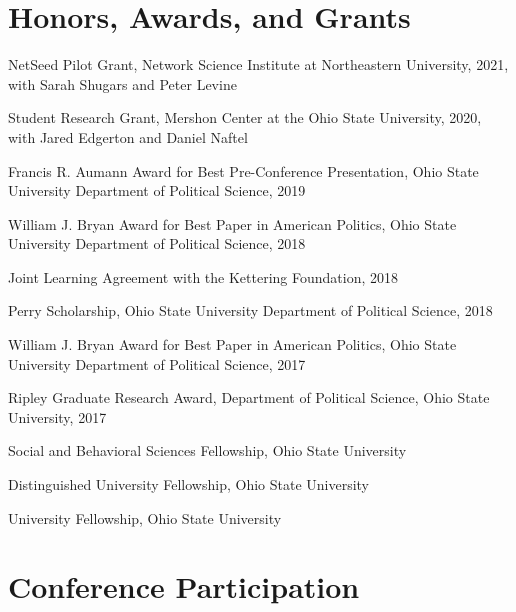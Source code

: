 \documentclass[letterpaper]{article}
\renewenvironment{itemize}{
  \begin{list}{}{
    \setlength{\leftmargin}{1.5em}
  }
}{
  \end{list}
}
\begin{document}
\section*{Honors, Awards, and Grants}

\begin{itemize}

\item NetSeed Pilot Grant, Network Science Institute at Northeastern University, 2021, with Sarah Shugars and Peter Levine

\item Student Research Grant, Mershon Center at the Ohio State University, 2020, with Jared Edgerton and Daniel Naftel

\item Francis R. Aumann Award for Best Pre-Conference Presentation, Ohio State University Department of Political Science, 2019

\item William J. Bryan Award for Best Paper in American Politics, Ohio State University Department of Political Science, 2018

\item Joint Learning Agreement with the Kettering Foundation, 2018

\item Perry Scholarship, Ohio State University Department of Political Science, 2018

\item William J. Bryan Award for Best Paper in American Politics, Ohio State University Department of Political Science, 2017

\item Ripley Graduate Research Award, Department of Political Science, Ohio State University, 2017

\item Social and Behavioral Sciences Fellowship, Ohio State University

\item Distinguished University Fellowship, Ohio State University

\item University Fellowship, Ohio State University
\end{itemize}

\section*{Conference Participation}
\end{document}

